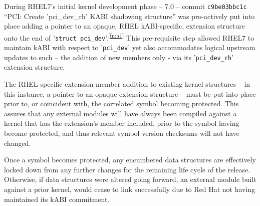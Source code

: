 \documentclass[10pt,oneside,english]{book}
\begin{document}
During RHEL7's initial kernel development phase -- 7.0 -- commit
\texttt{c9be03bbc1c} ``PCI: Create 'pci\_dev\_rh' KABI shadowing
structure'' was pro-actively put into place adding a pointer to an
opaque, RHEL kABI-specific, extension structure onto the end of '\texttt{struct
pci\_dev}'.\textsuperscript{\ref{fn:a1}} This pre-requisite step
allowed RHEL7 to maintain kABI with respect to '\texttt{pci\_dev}'
yet also accommodates logical upstream updates to such -- the addition
of new members only - via its '\texttt{pci\_dev\_rh}' extension structure.


The RHEL specific extension member addition to existing kernel structures
-- in this instance, a pointer to an opaque extension structure --
must be put into place prior to, or coincident with, the correlated
symbol becoming protected. This assures that any external modules
will have always been compiled against a kernel that has the extension's
member included, prior to the symbol having become protected, and
thus relevant symbol version checksums will not have changed.

Once a symbol becomes protected, any encumbered data structures are
effectively locked down from any further changes for the remaining
life cycle of the release. Otherwise, if data structures were altered
going forward, an external module built against a prior kernel, would
cease to link successfully due to Red Hat not having maintained its
kABI commitment.
\end{document}
